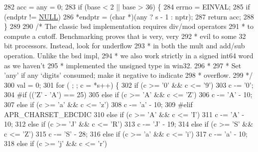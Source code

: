 \begin{DoxyCode}
282     acc = any = 0;
283     \textcolor{keywordflow}{if} (base < 2 || base > 36) \{
284     errno = EINVAL;
285         \textcolor{keywordflow}{if} (endptr != \hyperlink{pcre_8txt_ad7f989d16aa8ca809a36bc392c07fba1}{NULL})
286         *endptr = (\textcolor{keywordtype}{char} *)(any ? s - 1 : nptr);
287         \textcolor{keywordflow}{return} acc;
288     \}
289 
290     \textcolor{comment}{/* The classic bsd implementation requires div/mod operators}
291 \textcolor{comment}{     * to compute a cutoff.  Benchmarking proves that is very, very}
292 \textcolor{comment}{     * evil to some 32 bit processors.  Instead, look for underflow}
293 \textcolor{comment}{     * in both the mult and add/sub operation.  Unlike the bsd impl,}
294 \textcolor{comment}{     * we also work strictly in a signed int64 word as we haven't}
295 \textcolor{comment}{     * implemented the unsigned type in win32.}
296 \textcolor{comment}{     * }
297 \textcolor{comment}{     * Set 'any' if any `digits' consumed; make it negative to indicate}
298 \textcolor{comment}{     * overflow.}
299 \textcolor{comment}{     */}
300     val = 0;
301     \textcolor{keywordflow}{for} ( ; ; c = *s++) \{
302         \textcolor{keywordflow}{if} (c >= \textcolor{charliteral}{'0'} && c <= \textcolor{charliteral}{'9'})
303         c -= \textcolor{charliteral}{'0'};
304 \textcolor{preprocessor}{#if (('Z' - 'A') == 25)}
305     \textcolor{keywordflow}{else} \textcolor{keywordflow}{if} (c >= \textcolor{charliteral}{'A'} && c <= \textcolor{charliteral}{'Z'})
306         c -= \textcolor{charliteral}{'A'} - 10;
307     \textcolor{keywordflow}{else} \textcolor{keywordflow}{if} (c >= \textcolor{charliteral}{'a'} && c <= \textcolor{charliteral}{'z'})
308         c -= \textcolor{charliteral}{'a'} - 10;
309 \textcolor{preprocessor}{#elif APR\_CHARSET\_EBCDIC}
310     \textcolor{keywordflow}{else} \textcolor{keywordflow}{if} (c >= \textcolor{charliteral}{'A'} && c <= \textcolor{charliteral}{'I'})
311         c -= \textcolor{charliteral}{'A'} - 10;
312     \textcolor{keywordflow}{else} \textcolor{keywordflow}{if} (c >= \textcolor{charliteral}{'J'} && c <= \textcolor{charliteral}{'R'})
313         c -= \textcolor{charliteral}{'J'} - 19;
314     \textcolor{keywordflow}{else} \textcolor{keywordflow}{if} (c >= \textcolor{charliteral}{'S'} && c <= \textcolor{charliteral}{'Z'})
315         c -= \textcolor{charliteral}{'S'} - 28;
316     \textcolor{keywordflow}{else} \textcolor{keywordflow}{if} (c >= \textcolor{charliteral}{'a'} && c <= \textcolor{charliteral}{'i'})
317         c -= \textcolor{charliteral}{'a'} - 10;
318     \textcolor{keywordflow}{else} \textcolor{keywordflow}{if} (c >= \textcolor{charliteral}{'j'} && c <= \textcolor{charliteral}{'r'})

\end{DoxyCode}
